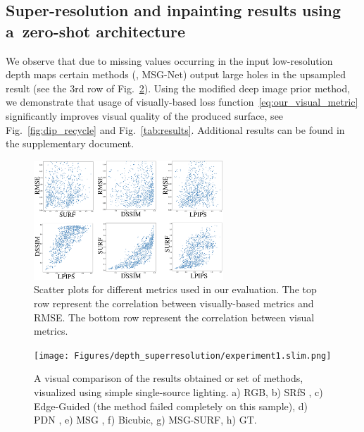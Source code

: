 \subsection{Super-resolution and inpainting results using a~zero-shot architecture}
\label{subsec:dip_experiments}
We observe that due to missing values occurring in the input low-resolution depth maps certain methods (\eg, MSG-Net) output large holes in the upsampled result (see the 3rd row of Fig.~\ref{fig:is_rmse_visual}). 
Using the modified deep image prior method, we demonstrate that usage of visually-based loss function~\eqref{eq:our_visual_metric} significantly improves visual quality of the produced surface, see Fig.~\ref{fig:dip_recycle} and Fig.~\ref{tab:results}.  Additional results can be found in the supplementary document.

\begin{figure}[hb!]
\begin{center}
\includegraphics[width=2.8in]{Figures/depth_superresolution/scatter_plots.png}
\end{center}
   \caption{Scatter plots for different metrics used in our evaluation. The top row represent the correlation between visually-based metrics and RMSE. The bottom row represent the correlation between visual metrics.
   }
\label{fig:is_rmse_scatterplots}
\end{figure}

\begin{figure}[p!]
\begin{center}
\texttt{[image: Figures/depth\_superresolution/experiment1.slim.png]}
\end{center}
   \caption{A visual comparison of the results obtained or set of methods, visualized using simple single-source lighting. a) RGB, b) SRfS \cite{haefner2018fight}, c) Edge-Guided \cite{xie2016edge} (the method \cite{xie2016edge} failed completely on this sample), d) PDN \cite{riegler2016deep}, e) MSG \cite{hui2016depth}, f) Bicubic, g) MSG-SURF, h) GT.
   }
\label{fig:is_rmse_visual}
\end{figure}

